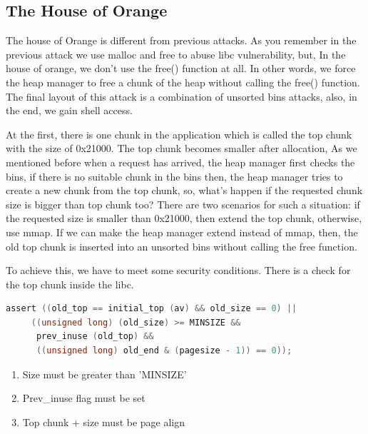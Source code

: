 \documentclass{masterthesis}
\newcommand*\ub{unsorted bins}
\begin{document}
\subsection{The House of Orange}

The house of Orange is different from previous attacks. As you remember in the previous attack we use malloc and free to abuse libc vulnerability, but, In the house of orange, we don’t use the free() function at all. In other words, we force the heap manager to free a chunk of the heap without calling the free() function. The final layout of this attack is a combination of \ub{} attacks, also, in the end, we gain shell access.

At the first, there is one chunk in the application which is called the top chunk with the size of 0x21000. The top chunk becomes smaller after allocation, As we mentioned before when a request has arrived, the heap manager first checks the bins, if there is no suitable chunk in the bins then, the heap manager tries to create a new chunk from the top chunk, so, what’s happen if the requested chunk size is bigger than top chunk too? There are two scenarios for such a situation: if the requested size is smaller than 0x21000, then extend the top chunk, otherwise, use mmap. If we can make the heap manager extend instead of mmap, then, the old top chunk is inserted into an \ub{} without calling the free function.

To achieve this, we have to meet some security conditions. There is a check for the top chunk inside the libc. 
\begin{lstlisting}[language=c,frame=tlrb]
 assert ((old_top == initial_top (av) && old_size == 0) ||
     ((unsigned long) (old_size) >= MINSIZE &&
      prev_inuse (old_top) &&
      ((unsigned long) old_end & (pagesize - 1)) == 0));
\end{lstlisting}

\begin{enumerate}
	\item Size must be greater than 'MINSIZE'
	\item Prev\_inuse flag must be set
	\item Top chunk + size must be page align
\end{enumerate}
\end{document}
